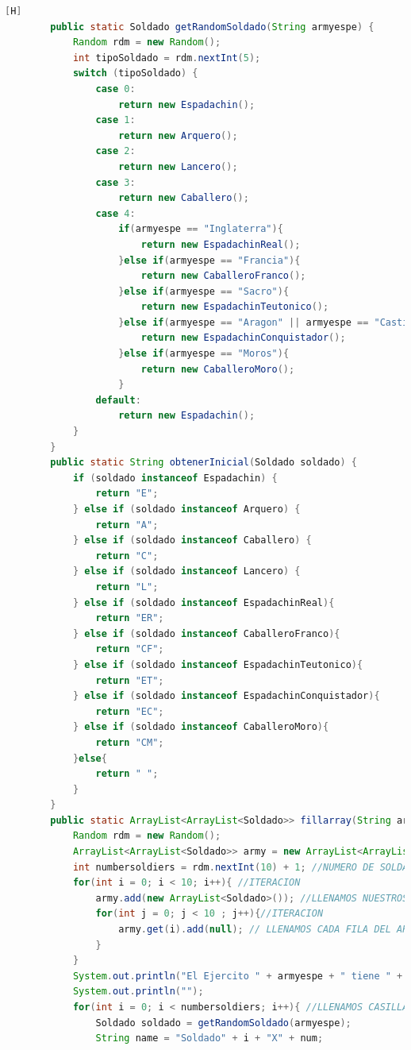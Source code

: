 \documentclass{article}
\begin{document}
	\begin{lstlisting}[language=java,caption={Las lineas de codigos de la clase Mapa}][H]
		public static Soldado getRandomSoldado(String armyespe) {
			Random rdm = new Random();
			int tipoSoldado = rdm.nextInt(5);
			switch (tipoSoldado) {
				case 0:
					return new Espadachin();
				case 1:
					return new Arquero();
				case 2:
					return new Lancero();
				case 3:
					return new Caballero();
				case 4:
					if(armyespe == "Inglaterra"){
						return new EspadachinReal();
					}else if(armyespe == "Francia"){
						return new CaballeroFranco();
					}else if(armyespe == "Sacro"){
						return new EspadachinTeutonico();
					}else if(armyespe == "Aragon" || armyespe == "Castilla"){
						return new EspadachinConquistador();
					}else if(armyespe == "Moros"){
						return new CaballeroMoro();
					}
				default:
					return new Espadachin();
			}
		}
		public static String obtenerInicial(Soldado soldado) {
			if (soldado instanceof Espadachin) {
				return "E";
			} else if (soldado instanceof Arquero) {
				return "A";
			} else if (soldado instanceof Caballero) {
				return "C";
			} else if (soldado instanceof Lancero) {
				return "L";
			} else if (soldado instanceof EspadachinReal){
				return "ER";
			} else if (soldado instanceof CaballeroFranco){
				return "CF";
			} else if (soldado instanceof EspadachinTeutonico){
				return "ET";
			} else if (soldado instanceof EspadachinConquistador){
				return "EC";
			} else if (soldado instanceof CaballeroMoro){
				return "CM";
			}else{
				return " ";
			}
		}
		public static ArrayList<ArrayList<Soldado>> fillarray(String armyespe, int num){
			Random rdm = new Random();
			ArrayList<ArrayList<Soldado>> army = new ArrayList<ArrayList<Soldado>>();
			int numbersoldiers = rdm.nextInt(10) + 1; //NUMERO DE SOLDADOS ALEATORIOS ENTRE 1 A 10 SOLDADOS 
			for(int i = 0; i < 10; i++){ //ITERACION
				army.add(new ArrayList<Soldado>()); //LLENAMOS NUESTROS ARRAYLIST BIDIMENSIONAL CON CADA FILA PARA QUE CUMPLAN CON ESTRUCTURA DEL TABLERO
				for(int j = 0; j < 10 ; j++){//ITERACION
					army.get(i).add(null); // LLENAMOS CADA FILA DEL ARRAYLIST CON UN OBJETO SOLDADO CON TAL QUE ESTE SEA NULL PARA QUE SEPA QUE ESTE TIENE UNA CASILLA PERO NO HAY NADIE TODAVIA SE PUEDE LLENAR 
				}
			}
			System.out.println("El Ejercito " + armyespe + " tiene " + numbersoldiers + " soldados : " ); 
			System.out.println("");
			for(int i = 0; i < numbersoldiers; i++){ //LLENAMOS CASILLAS CON CADA SOLDADO CREADO ALEATORIAMENTE
				Soldado soldado = getRandomSoldado(armyespe);
				String name = "Soldado" + i + "X" + num;

\end{lstlisting}
\end{document}
